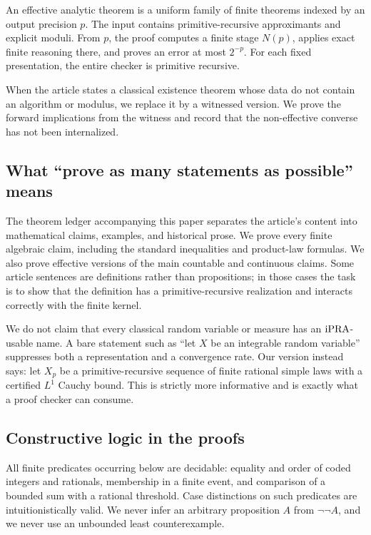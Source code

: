 \begin{definition}
An effective analytic theorem is a uniform family of finite theorems indexed by
an output precision \(p\).  The input contains primitive-recursive approximants
and explicit moduli.  From \(p\), the proof computes a finite stage \(N(p)\),
applies exact finite reasoning there, and proves an error at most \(2^{-p}\).
For each fixed presentation, the entire checker is primitive recursive.
\end{definition}

\begin{definition}
When the article states a classical existence theorem whose data do not contain
an algorithm or modulus, we replace it by a witnessed version.  We prove the
forward implications from the witness and record that the non-effective
converse has not been internalized.
\end{definition}

\subsection{What ``prove as many statements as possible'' means}

The theorem ledger accompanying this paper separates the article's content
into mathematical claims, examples, and historical prose.  We prove every
finite algebraic claim, including the standard inequalities and product-law
formulas.  We also prove effective versions of the main countable and
continuous claims.  Some article sentences are definitions rather than
propositions; in those cases the task is to show that the definition has a
primitive-recursive realization and interacts correctly with the finite
kernel.

We do not claim that every classical random variable or measure has an
\(\mathrm{iPRA}\)-usable name.  A bare statement such as ``let \(X\) be an integrable
random variable'' suppresses both a representation and a convergence rate.
Our version instead says: let \(X_p\) be a primitive-recursive sequence of
finite rational simple laws with a certified \(L^1\) Cauchy bound.  This is
strictly more informative and is exactly what a proof checker can consume.

\subsection{Constructive logic in the proofs}

All finite predicates occurring below are decidable: equality and order of
coded integers and rationals, membership in a finite event, and comparison of a
bounded sum with a rational threshold.  Case distinctions on such predicates
are intuitionistically valid.  We never infer an arbitrary proposition \(A\)
from \(\neg\neg A\), and we never use an unbounded least counterexample.

